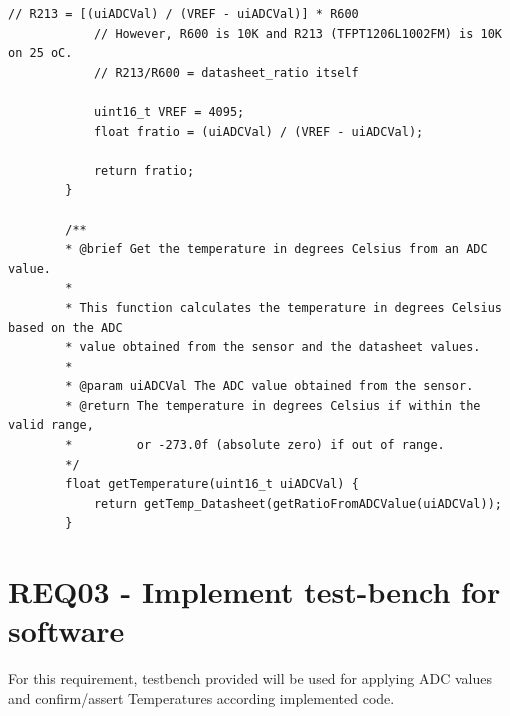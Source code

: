 \documentclass{article}
\begin{document}
\begin{lstlisting}[caption={C Code for Temperature Sensor}, label=code:temperature_sensor]
			// R213 = [(uiADCVal) / (VREF - uiADCVal)] * R600
			// However, R600 is 10K and R213 (TFPT1206L1002FM) is 10K on 25 oC.
			// R213/R600 = datasheet_ratio itself
			
			uint16_t VREF = 4095;
			float fratio = (uiADCVal) / (VREF - uiADCVal);
			
			return fratio;
		}
		
		/**
		* @brief Get the temperature in degrees Celsius from an ADC value.
		*
		* This function calculates the temperature in degrees Celsius based on the ADC
		* value obtained from the sensor and the datasheet values.
		*
		* @param uiADCVal The ADC value obtained from the sensor.
		* @return The temperature in degrees Celsius if within the valid range,
		*         or -273.0f (absolute zero) if out of range.
		*/
		float getTemperature(uint16_t uiADCVal) {
			return getTemp_Datasheet(getRatioFromADCValue(uiADCVal));
		}
			\end{lstlisting}
	


	
	\section{REQ03 - Implement test-bench for software}
	For this requirement, testbench provided will be used for applying ADC values and confirm/assert Temperatures according implemented code.



	
\end{document}
